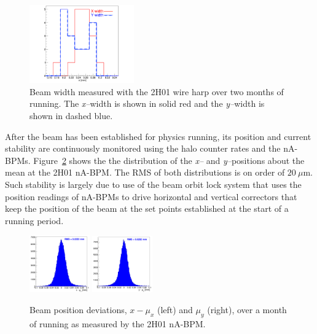 \begin{figure}[ht]
\begin{center}
\includegraphics[width=0.4\textwidth]{BeamWidth.pdf}
	\caption{Beam width measured with the 2H01 wire harp over two months of running. The {\it x--}width is shown in solid red and the 
	{\it y--}width is shown in dashed blue.}
\label{fig:prof2h01}
\end{center}
\end{figure}

After the beam has been established for physics running, its position and current stability are continuously monitored using the halo 
counter rates and the nA-BPMs. Figure~\ref{fig:position} shows the the distribution of the {\it x--} and {\it y--}positions about the mean at the 
2H01 nA-BPM. The RMS of both distributions is on order of $20~\mu$m. Such stability is largely due to use of the beam orbit lock system 
that uses the position readings of nA-BPMs to drive horizontal and vertical correctors that keep the position of the beam at the set points 
established at the start of a running period.    

\begin{figure}[ht]
\begin{center}
\includegraphics[width=0.23\textwidth]{position_2h01x.pdf}
\includegraphics[width=0.23\textwidth]{position_2h01y.pdf}
\caption{Beam position deviations, $x-\mu_x$ (left)  and $\mu_y$ (right), over a month of running as measured by the 2H01 nA-BPM. }
\label{fig:position}
\end{center}
\end{figure}



